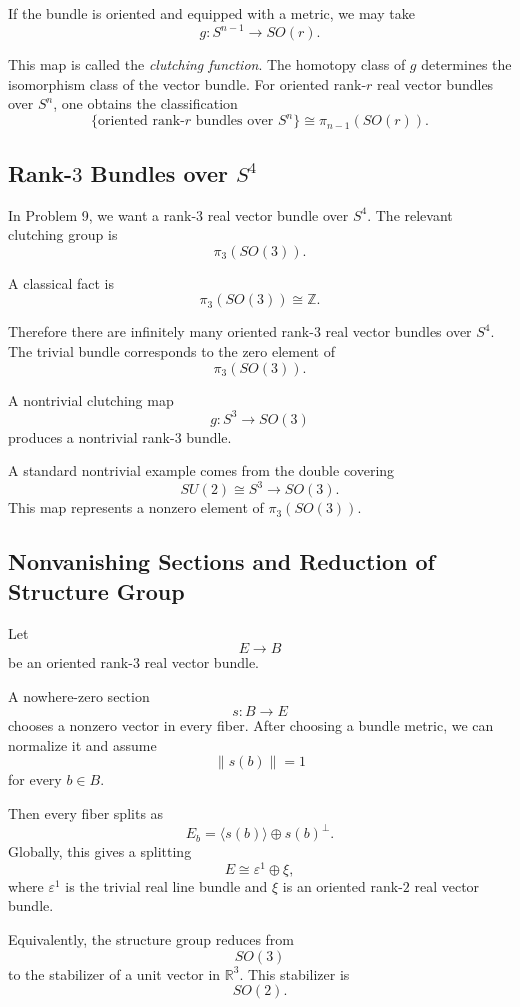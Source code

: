 \documentclass[12pt,a4paper]{article}
\theoremstyle{notespace}
\begin{document}
If the bundle is oriented and equipped with a metric, we may take
\[
g:S^{n-1}\to SO(r).
\]

This map is called the \emph{clutching function}. The homotopy class of \(g\)
determines the isomorphism class of the vector bundle. For oriented rank-\(r\)
real vector bundles over \(S^n\), one obtains the classification
\[
\{\text{oriented rank-}r\text{ bundles over }S^n\}
\cong
\pi_{n-1}(SO(r)).
\]

\subsection{Rank-\(3\) Bundles over \(S^4\)}

In Problem 9, we want a rank-\(3\) real vector bundle over \(S^4\). The relevant
clutching group is
\[
\pi_3(SO(3)).
\]

A classical fact is
\[
\pi_3(SO(3))\cong \mathbb Z.
\]

Therefore there are infinitely many oriented rank-\(3\) real vector bundles over
\(S^4\). The trivial bundle corresponds to the zero element of
\[
\pi_3(SO(3)).
\]

A nontrivial clutching map
\[
g:S^3\to SO(3)
\]
produces a nontrivial rank-\(3\) bundle.

A standard nontrivial example comes from the double covering
\[
SU(2)\cong S^3\longrightarrow SO(3).
\]
This map represents a nonzero element of \(\pi_3(SO(3))\).

\subsection{Nonvanishing Sections and Reduction of Structure Group}

Let
\[
E\to B
\]
be an oriented rank-\(3\) real vector bundle.

A nowhere-zero section
\[
s:B\to E
\]
chooses a nonzero vector in every fiber. After choosing a bundle metric, we can
normalize it and assume
\[
\|s(b)\|=1
\]
for every \(b\in B\).

Then every fiber splits as
\[
E_b=\langle s(b)\rangle\oplus s(b)^\perp.
\]
Globally, this gives a splitting
\[
E\cong \varepsilon^1\oplus \xi,
\]
where \(\varepsilon^1\) is the trivial real line bundle and \(\xi\) is an
oriented rank-\(2\) real vector bundle.

Equivalently, the structure group reduces from
\[
SO(3)
\]
to the stabilizer of a unit vector in \(\mathbb R^3\). This stabilizer is
\[
SO(2).
\]
\end{document}
